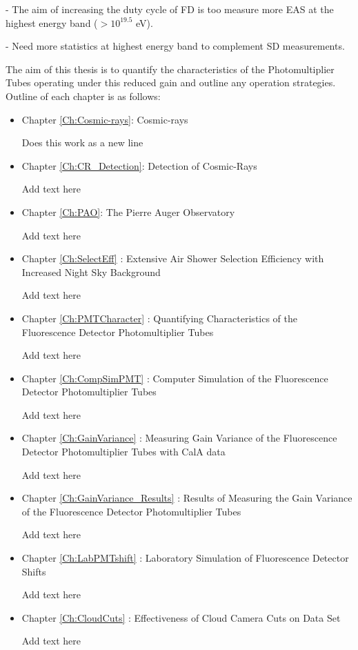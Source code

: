 - The aim of increasing the duty cycle of FD is too measure more EAS at the highest energy band ($> 10^{19.5}$ eV).

- Need more statistics at highest energy band to complement SD measurements.

The aim of this thesis is to quantify the characteristics of the Photomultiplier Tubes operating under this reduced gain and outline any operation strategies. Outline of each chapter is as follows:

\begin{itemize}
\item  Chapter \ref{Ch:Cosmic-rays}: Cosmic-rays

Does this work as a new line

\item Chapter \ref{Ch:CR_Detection}: Detection of Cosmic-Rays

Add text here

\item Chapter \ref{Ch:PAO}: The Pierre Auger Observatory

Add text here

\item Chapter \ref{Ch:SelectEff} : Extensive Air Shower Selection Efficiency with Increased Night Sky Background 

Add text here

\item Chapter \ref{Ch:PMTCharacter} : Quantifying Characteristics of the Fluorescence Detector Photomultiplier Tubes 

Add text here

\item Chapter \ref{Ch:CompSimPMT} : Computer Simulation of the Fluorescence Detector Photomultiplier Tubes 

Add text here

\item Chapter \ref{Ch:GainVariance} : Measuring Gain Variance of the Fluorescence Detector Photomultiplier Tubes with CalA data 

Add text here

\item Chapter \ref{Ch:GainVariance_Results} : Results of Measuring the Gain Variance of the Fluorescence Detector Photomultiplier Tubes 

Add text here

\item Chapter \ref{Ch:LabPMTshift} : Laboratory Simulation of Fluorescence Detector Shifts

Add text here

\item Chapter \ref{Ch:CloudCuts} : Effectiveness of Cloud Camera Cuts on Data Set

Add text here

%


\end{itemize}